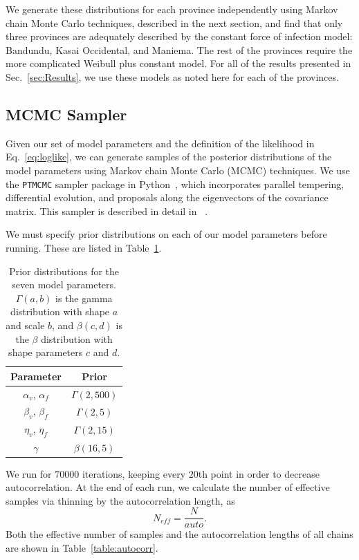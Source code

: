 \documentclass[nofootinbib,aps,pre,twocolumn,superscriptaddress,showkeys,showpacs]{revtex4-1}
\begin{document}
We generate these distributions for each province independently using Markov chain Monte Carlo techniques, described in the next section, and find that only three provinces are adequately described by the constant force of infection model: Bandundu, Kasai Occidental, and Maniema. The rest of the provinces require the more complicated Weibull plus constant model. For all of the results presented in Sec.~\ref{sec:Results}, we use these models as noted here for each of the provinces.

\subsection{MCMC Sampler \label{subsec:MCMC}}
Given our set of model parameters and the definition of the likelihood in Eq.~\ref{eq:loglike}, we can generate samples of the posterior distributions of the model parameters using Markov chain Monte Carlo (MCMC) techniques. We use the \texttt{PTMCMC} sampler package in Python~\cite{PTMCMC}, which incorporates parallel tempering, differential evolution, and proposals along the eigenvectors of the covariance matrix. This sampler is described in detail in ~\cite{Arzoumanian2014}.

We must specify prior distributions on each of our model parameters before running. These are listed in Table~\ref{table:priors}. 
\begin{table}
\begin{center}
\begin{tabular}{ c|c }  
Parameter & Prior \\
 \hline
 $\alpha_v$, $\alpha_f$ & $\Gamma(2,500)$ \\ 
 $\beta_v$, $\beta_f$ &$ \Gamma(2,5)$ \\ 
 $\eta_v$, $\eta_f$&$ \Gamma(2,15)$ \\ 
 $\gamma$ & $\beta(16,5)$ \\
 \hline
\end{tabular}
\caption{Prior distributions for the seven model parameters. $\Gamma(a,b)$ is the gamma distribution with shape $a$ and scale $b$, and $\beta(c,d)$ is the $\beta$ distribution with shape parameters $c$ and $d$. \label{table:priors}}
\end{center}
\end{table}

We run for $70000$ iterations, keeping every $20$th point in order to decrease autocorrelation. At the end of each run, we calculate the number of effective samples via thinning by the autocorrelation length, as
\begin{equation}
N_{eff} = \frac{N}{auto}.
\end{equation}
Both the effective number of samples and the autocorrelation lengths of all chains are shown in Table~\ref{table:autocorr}.
\end{document}
